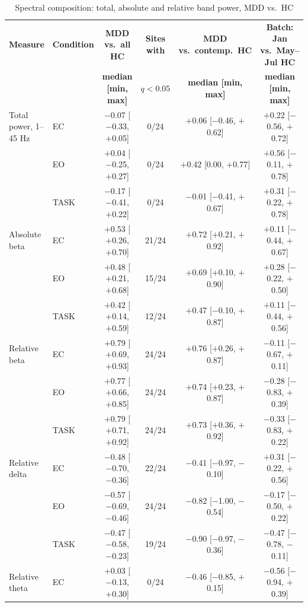 \begin{table}[!t]
\caption{Spectral composition: total, absolute and relative band power, MDD vs.\ HC}
\label{tabS_composicao}
\centering
\footnotesize
\setlength{\tabcolsep}{4pt}
\renewcommand{\arraystretch}{1.1}
\begin{tabular}{llcccc}
\toprule
\textbf{Measure} & \textbf{Condition} & \textbf{MDD vs.\ all HC} & \textbf{Sites with} & \textbf{MDD vs.\ contemp.\ HC} & \textbf{Batch: Jan vs.\ May--Jul HC} \\
 & & \textbf{median [min, max]} & \textbf{$q < 0.05$} & \textbf{median [min, max]} & \textbf{median [min, max]} \\
\midrule
Total power, 1--45 Hz & EC & $-$0.07 [$-$0.33, $+$0.05] & 0/24 & $+$0.06 [$-$0.46, $+$0.62] & $+$0.22 [$-$0.56, $+$0.72] \\
 & EO & $+$0.04 [$-$0.25, $+$0.27] & 0/24 & $+$0.42 [0.00, $+$0.77] & $+$0.56 [$-$0.11, $+$0.78] \\
 & TASK & $-$0.17 [$-$0.41, $+$0.22] & 0/24 & $-$0.01 [$-$0.41, $+$0.67] & $+$0.31 [$-$0.22, $+$0.78] \\
\addlinespace
Absolute beta & EC & $+$0.53 [$+$0.26, $+$0.70] & 21/24 & $+$0.72 [$+$0.21, $+$0.92] & $+$0.11 [$-$0.44, $+$0.67] \\
 & EO & $+$0.48 [$+$0.21, $+$0.68] & 15/24 & $+$0.69 [$+$0.10, $+$0.90] & $+$0.28 [$-$0.22, $+$0.50] \\
 & TASK & $+$0.42 [$+$0.14, $+$0.59] & 12/24 & $+$0.47 [$-$0.10, $+$0.87] & $+$0.11 [$-$0.44, $+$0.56] \\
\addlinespace
Relative beta & EC & $+$0.79 [$+$0.69, $+$0.93] & 24/24 & $+$0.76 [$+$0.26, $+$0.87] & $-$0.11 [$-$0.67, $+$0.11] \\
 & EO & $+$0.77 [$+$0.66, $+$0.85] & 24/24 & $+$0.74 [$+$0.23, $+$0.87] & $-$0.28 [$-$0.83, $+$0.39] \\
 & TASK & $+$0.79 [$+$0.71, $+$0.92] & 24/24 & $+$0.73 [$+$0.36, $+$0.92] & $-$0.33 [$-$0.83, $+$0.22] \\
\midrule
Relative delta & EC & $-$0.48 [$-$0.70, $-$0.36] & 22/24 & $-$0.41 [$-$0.97, $-$0.10] & $+$0.31 [$-$0.22, $+$0.56] \\
 & EO & $-$0.57 [$-$0.69, $-$0.46] & 24/24 & $-$0.82 [$-$1.00, $-$0.54] & $-$0.17 [$-$0.50, $+$0.22] \\
 & TASK & $-$0.47 [$-$0.58, $-$0.23] & 19/24 & $-$0.90 [$-$0.97, $-$0.36] & $-$0.47 [$-$0.78, $-$0.11] \\
\addlinespace
Relative theta & EC & $+$0.03 [$-$0.13, $+$0.30] & 0/24 & $-$0.46 [$-$0.85, $+$0.15] & $-$0.56 [$-$0.94, $+$0.39] \\

\end{tabular}
\end{table}
